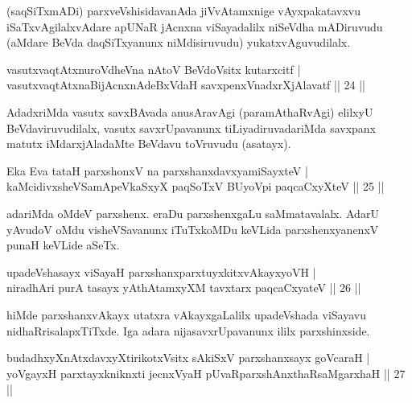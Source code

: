 \begin{artha}
(saqSiTxmADi) parxveVshisidavanAda jiVvAtamxnige vAyxpakatavxvu iSaTxvAgilalxvAdare apUNaR jAcnxna viSayadalilx niSeVdha mADiruvudu (aMdare BeVda daqSiTxyanunx niMdisiruvudu) yukatxvAguvudilalx.
\end{artha}


\begin{shl}
vasutxvaqtAtxnuroVdheVna nAtoV BeVdoV\s sitx kutarxcitf |\\
vasutxvaqtAtxnaBijAcnxnAdeBxVdaH savxpenxVnadxrXjAlavatf \hfill || 24 ||
\end{shl}

\begin{artha}
AdadxriMda vasutx savxBAvada anusAravAgi (paramAthaRvAgi) elilxyU BeVdaviruvudilalx, vasutx savxrUpavanunx tiLiyadiruvadariMda savxpanx matutx iMdarxjAladaMte BeVdavu toVruvudu (asatayx).
\end{artha}

\begin{shl}
Eka Eva tataH parxshonxV na parxshanxdavxyamiSayxteV |\\
kaMcidivxsheVSamApeVkaSxyX paqSoTxV BUyoV\s pi paqcaCxyXteV \hfill || 25 ||
\end{shl}

\begin{artha}
adariMda oMdeV parxshenx. eraDu parxshenxgaLu saMmatavalalx. AdarU yAvudoV oMdu visheVSavanunx iTuTxkoMDu keVLida parxshenxyanenxV punaH keVLide aSeTx.
\end{artha}%

\begin{shl}
upadeVshasayx viSayaH parxshanxparxtuyxkitxvAkayxyoVH |\\
niradhAri purA tasayx yAthAtamxyXM tavxtarx paqcaCxyateV \hfill || 26 ||
\end{shl}

\begin{artha}
hiMde parxshanxvAkayx utatxra vAkayxgaLalilx upadeVshada viSayavu nidhaRrisalapxTiTxde. Iga adara nijasavxrUpavanunx ililx parxshinxside.
\end{artha}


\begin{shl}
budadhxyXnAtxdavxyXtirikotxV\s sitx sAkiSxV parxshanxsayx goVcaraH |\\
yoVgayxH parxtayxkniknxti jecnxVyaH pUvaRparxshAnxthaRsaMgarxhaH \hfill || 27 ||
\end{shl}

